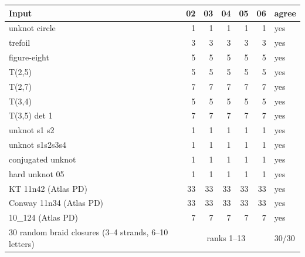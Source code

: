 \begin{tabular}{@{}lrrrrrl@{}}
\toprule
Input & 02 & 03 & 04 & 05 & 06 & agree \\
\midrule
unknot circle & 1 & 1 & 1 & 1 & 1 & yes \\
trefoil & 3 & 3 & 3 & 3 & 3 & yes \\
figure-eight & 5 & 5 & 5 & 5 & 5 & yes \\
T(2,5) & 5 & 5 & 5 & 5 & 5 & yes \\
T(2,7) & 7 & 7 & 7 & 7 & 7 & yes \\
T(3,4) & 5 & 5 & 5 & 5 & 5 & yes \\
T(3,5) det 1 & 7 & 7 & 7 & 7 & 7 & yes \\
unknot s1 s2 & 1 & 1 & 1 & 1 & 1 & yes \\
unknot s1s2s3s4 & 1 & 1 & 1 & 1 & 1 & yes \\
conjugated unknot & 1 & 1 & 1 & 1 & 1 & yes \\
hard unknot 05 & 1 & 1 & 1 & 1 & 1 & yes \\
KT 11n42 (Atlas PD) & 33 & 33 & 33 & 33 & 33 & yes \\
Conway 11n34 (Atlas PD) & 33 & 33 & 33 & 33 & 33 & yes \\
10\_124 (Atlas PD) & 7 & 7 & 7 & 7 & 7 & yes \\
\midrule
30 random braid closures (3--4 strands, 6--10 letters) & \multicolumn{5}{c}{ranks 1--13} & 30/30 \\
\bottomrule
\end{tabular}
